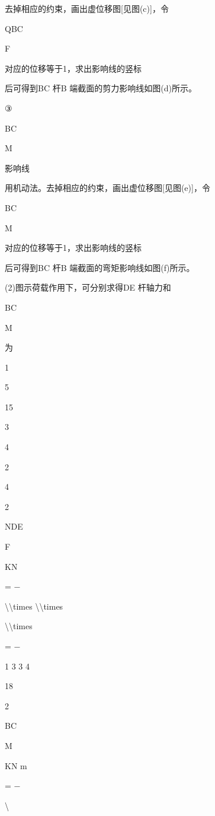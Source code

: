 \documentclass[UTF8,12pt,a4paper,openany]{ctexbook}
\begin{document}
\begin{enumerate}[label=\textbf{\arabic*.},leftmargin=2em]
去掉相应的约束，画出虚位移图[见图(c)]，令\par QBC\par F\par 对应的位移等于1，求出影响线的竖标\par 后可得到BC 杆B 端截面的剪力影响线如图(d)所示。\par ③\par BC\par M\par 影响线\par 用机动法。去掉相应的约束，画出虚位移图[见图(e)]，令\par BC\par M\par 对应的位移等于1，求出影响线的竖标\par 后可得到BC 杆B 端截面的弯矩影响线如图(f)所示。\par (2)图示荷载作用下，可分别求得DE 杆轴力和\par BC\par M\par 为\par 1\par 5\par 15\par 3\par 4\par 2\par 4\par 2\par NDE\par F\par KN\par = −\par \textbackslash{}\textbackslash{}times \textbackslash{}\textbackslash{}times\par \textbackslash{}\textbackslash{}times\par = −\par 1 3 3 4\par 18\par 2\par BC\par M\par KN m\par = −\par \textbackslash{}\textb
\end{enumerate}
\end{document}

